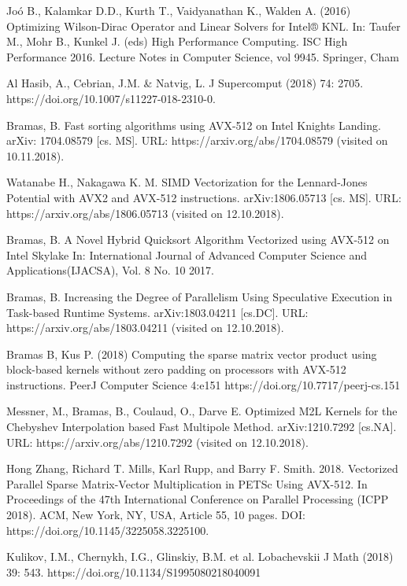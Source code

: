 \documentclass[
11pt,%
tightenlines,%
twoside,%
onecolumn,%
nofloats,%
nobibnotes,%
nofootinbib,%
superscriptaddress,%
noshowpacs,%
centertags]%
{revtex4}
\begin{document}
\begin{thebibliography}{99}
Joó B., Kalamkar D.D., Kurth T., Vaidyanathan K., Walden A. (2016) Optimizing Wilson-Dirac Operator and Linear Solvers for Intel® KNL. In: Taufer M., Mohr B., Kunkel J. (eds) High Performance Computing. ISC High Performance 2016. Lecture Notes in Computer Science, vol 9945. Springer, Cham

Al Hasib, A., Cebrian, J.M. \& Natvig, L. J Supercomput (2018) 74: 2705. https://doi.org/10.1007/s11227-018-2310-0.

Bramas, B. Fast sorting algorithms using AVX-512 on Intel Knights Landing. arXiv: 1704.08579 [cs. MS]. URL: https://arxiv.org/abs/1704.08579 (visited on 10.11.2018).

Watanabe H., Nakagawa K. M. SIMD Vectorization for the Lennard-Jones Potential with AVX2 and AVX-512 instructions. arXiv:1806.05713 [cs. MS]. URL: https://arxiv.org/abs/1806.05713 (visited on 12.10.2018).

Bramas, B. A Novel Hybrid Quicksort Algorithm Vectorized using AVX-512 on Intel Skylake In: International Journal of Advanced Computer Science and Applications(IJACSA), Vol. 8 No. 10 2017.

Bramas, B. Increasing the Degree of Parallelism Using Speculative Execution in Task-based Runtime Systems. arXiv:1803.04211 [cs.DC]. URL: https://arxiv.org/abs/1803.04211 (visited on 12.10.2018).

Bramas B, Kus P. (2018) Computing the sparse matrix vector product using block-based kernels without zero padding on processors with AVX-512 instructions. PeerJ Computer Science 4:e151 https://doi.org/10.7717/peerj-cs.151

Messner, M., Bramas, B., Coulaud, O., Darve E. Optimized M2L Kernels for the Chebyshev Interpolation based Fast Multipole Method. arXiv:1210.7292 [cs.NA]. URL: https://arxiv.org/abs/1210.7292 (visited on 12.10.2018).

Hong Zhang, Richard T. Mills, Karl Rupp, and Barry F. Smith. 2018. Vectorized Parallel Sparse Matrix-Vector Multiplication in PETSc Using AVX-512. In Proceedings of the 47th International Conference on Parallel Processing (ICPP 2018). ACM, New York, NY, USA, Article 55, 10 pages. DOI: https://doi.org/10.1145/3225058.3225100.

Kulikov, I.M., Chernykh, I.G., Glinskiy, B.M. et al. Lobachevskii J Math (2018) 39: 543. https://doi.org/10.1134/S1995080218040091


\end{thebibliography}
\end{document}
